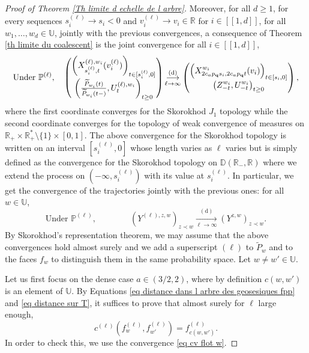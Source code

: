\documentclass[11pt]{article}
\numberwithin{equation}{section}
\def \R{\mathbb {R}}
\def \U{\mathbb{U}}
\def\P{\mathbb{P}}
\def\lb{[\![}
\def\rb{]\!]}
\begin{document}
\begin{proof}[Proof of Theorem \ref{Th limite d echelle de l arbre}]
Moreover, for all $d\ge 1$, for every sequences $s_i^{(\ell)} \to s_i <0$ and $v_i^{(\ell)} \to v_i \in \R$ for $i \in \lb 1, d \rb$, for all $w_1, \ldots, w_d \in \U$, jointly with the previous convergences, a consequence of Theorem \ref{th limite du coalescent} is the joint convergence for all $i \in \lb 1, d \rb$,
\begin{equation}\label{eq cv flot w}
	\text{Under }\P^{(\ell)}, \quad 
	\begin{pmatrix}
	\left(X^{(\ell),w_i}_{s_i^{(\ell)},t}(v_i^{(\ell)})\right)_{t \in [s_i^{(\ell)},0]}\\
	\left(
	\frac{\widetilde{P}_{w_i}(t)}{\widetilde{P}_{w_i}(t-)}, U^{(\ell),w_i}_t
	\right)_{t \ge 0}
	\end{pmatrix}
	\mathop{\longrightarrow}\limits_{\ell \to \infty}^{(\mathrm{d})}
	\begin{pmatrix}
	\left(X^{w_i}_{2c_a p_{\bf q} s_i,2c_a p_{\bf q} t}(v_i)\right)_{t \in [s_i,0]} 
	\\
	\left(
	Z^{w_i}_{-t}, U^{w_i}_{-t}
	\right)_{t \ge 0}
	\end{pmatrix},
\end{equation}
where the first coordinate converges for the Skorokhod $J_1$ topology while the second coordinate converges for the topology of weak convergence of measures on $\R_+ \times \R_+^*\setminus \{1\} \times [0,1]$. The above convergence for the Skorokhod topology is written on an interval $[s_i^{(\ell)}, 0]$ whose length varies as $\ell$ varies but is simply defined as the convergence for the Skorokhod topology on $\mathbb{D}(\R_-, \R)$ where we extend the process on $(-\infty,s_i^{(\ell)})$ with its value at $s_i^{(\ell)}$. In particular, we get the convergence of the trajectories jointly with the previous ones: for all $w \in \U$,
\begin{equation}\label{eq cv trajectoires}
	\text{Under }\P^{(\ell)}, \qquad \qquad
	(Y^{(\ell),z,w})_{z\prec w} 
	\mathop{\longrightarrow}\limits_{\ell \to \infty}^{(\mathrm{d})}
	(Y^{z,w})_{z \prec w}.
\end{equation}
By Skorokhod's representation theorem, we may assume that the above convergences hold almost surely and we add a superscript $(\ell)$ to $\widetilde{P}_w$ and to the faces $f_w$ to distinguish them in the same probability space. Let $w\neq w' \in \U$. 

Let us first focus on the dense case $a\in (3/2,2)$, where by definition $c(w,w')$ is an element of $\U$. By Equations \eqref{eq distance dans l arbre des geosesiques fpp} and  \eqref{eq distance sur T}, it suffices to prove that almost surely for $\ell$ large enough,
	\begin{equation}\label{eq cv temps de coalescence}
	c^{(\ell)}(f^{(\ell)}_w,f^{(\ell)}_{w'}) = f^{(\ell)}_{c(w,w')}.
	\end{equation}
In order to check this, we use the convergence \eqref{eq cv flot w}. 


\end{proof}
\end{document}
